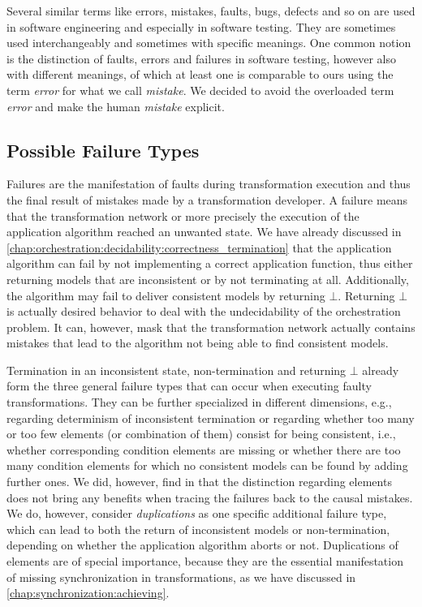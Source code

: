Several similar terms like errors, mistakes, faults, bugs, defects and so on are used in software engineering and especially in software testing.
They are sometimes used interchangeably and sometimes with specific meanings.
One common notion is the distinction of faults, errors and failures in software testing, however also with different meanings, of which at least one is comparable to ours using the term \emph{error} for what we call \emph{mistake}.
We decided to avoid the overloaded term \emph{error} and make the human \emph{mistake} explicit.


\subsection{Possible Failure Types}
\label{chap:errors:categorization:failures}

Failures are the manifestation of faults during transformation execution and thus the final result of mistakes made by a transformation developer.
A failure means that the transformation network or more precisely the execution of the application algorithm reached an unwanted state.
We have already discussed in \autoref{chap:orchestration:decidability:correctness_termination} that the application algorithm can fail by not implementing a correct application function, thus either returning models that are inconsistent or by not terminating at all.
Additionally, the algorithm may fail to deliver consistent models by returning $\bot$.
Returning $\bot$ is actually desired behavior to deal with the undecidability of the orchestration problem.
It can, however, mask that the transformation network actually contains mistakes that lead to the algorithm not being able to find consistent models.

Termination in an inconsistent state, non-termination and returning $\bot$ already form the three general failure types that can occur when executing faulty transformations.
They can be further specialized in different dimensions, e.g., regarding determinism of inconsistent termination or regarding whether too many or too few elements (or combination of them) consist for being consistent, i.e., whether corresponding condition elements are missing or whether there are too many condition elements for which no consistent models can be found by adding further ones.
We did, however, find in \cite[Table~5.7]{saglam2020ma} that the distinction regarding elements does not bring any benefits when tracing the failures back to the causal mistakes.
We do, however, consider \emph{duplications} as one specific additional failure type, which can lead to both the return of inconsistent models or non-termination, depending on whether the application algorithm aborts or not.
Duplications of elements are of special importance, because they are the essential manifestation of missing synchronization in transformations, as we have discussed in \autoref{chap:synchronization:achieving}.

